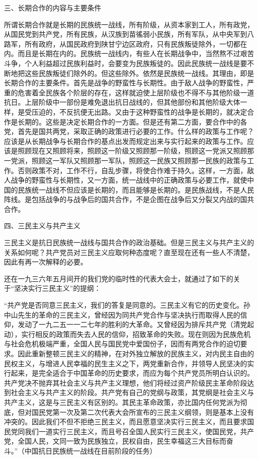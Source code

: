 三、长期合作的内容与主要条件

所谓长期合作就是长期的民族统一战线，所有阶级，从资本家到工人，所有政党，从国民党到共产党，所有民族，从汉族到苗徭弱小民族，所有军队，从中央军到八路军，所有政府，从国民政府到陕甘宁边区政府，只有民族叛徒除外，一切都在内。而且是长期在内的。民族统一战线内，有些人在长期战争中，当然熬不过艰苦斗争，个人利益超过民族利益时，会要变为民族叛徒的。因此民族统一战线是要不断地把这些民族叛徒们除外的。但这些除外。依然是民族统一战线。其理由，即是长期合作的主要条件。首先是战争的野蛮性与长期性。由于敌人战争的野蛮性，严重的危害着全民族各个阶层的存在，这样就迫使上层阶级也不得不与其他阶级一道抗日。上层阶级中一部份是难免退出抗日战线的，但其他部份和其他阶级大体一样，是受压迫的，不反抗便无出路。又由于这种野蛮性的战争是长期的，就决定合作是长期的。这些是决定长期合作的一方面。但是还有第二方面，要合作中的各党，首先是国共两党，采取正确的政策进行必要的工作。什么样的政策与工作呢？应该是从长期战争与长期合作的基点出发而规定出来与实行起来的政策与工作。应该是照顾现在又照顾将来，照顾这一阶级又照顾那一阶级，照顾这一党派又照顾那一党派，照顾这一军队又照顾那一军队，照顾这一民族又照顾那一民族的政策与工作。否则政策不对，工作不行，自乱步骤，将使合作难于持久。这样，一方面，敌人战争的野蛮性与长期性，又一方面，统一战线中的正确政策与必要工作，就使中国的民族统一战线不但应该是长期的，而且能够是长期的。是民族战线，不是人民阵线。是包括战争的与战争后的国共合作，不是企图在战争后又分裂又内战的国共合作。

四、三民主义与共产主义

三民主义是抗日民族统一战线与国共合作的政治基础。但是三民主义与共产主义的关系如何呢？共产党员对三民主义应取何种态度呢？直至现在还有一些人不清楚，因此有再一次解释的必要。

还在一九三六年五月间开的我们党的临时性的代表大会士，就通过了如下的关于“坚决实行三民主义”的提纲：

“共产党是否同意三民主义，我们的答复是同意的。三民主义有它的历史变化。孙中山先生的革命的三民主义，曾经因为同共产党合作与坚决执行而取得人民的信仰，发动了一九二五一一二七年的胜利的大革命。又曾经因为排斥共产党（清党起动），实行相反的政策而失去人民的信仰，招致革命的失败。现在则因为民族危机与社会危机极端严重，全国人民与国民党中爱国份子，因而有两党合作的迫切要求。因此重新整顿三民主义的精神，在对外独立解放的民族主义，对内民主自由的民权主义，与增进人民幸福的民生主义之下，两党重新合作，并领导人民坚决的实行起来，是完全适合于中国革命的历史要求，而应为每个共产党员所明白认识的。共产党决不抛弃其社会主义与共产主义理想，他们将经过资产阶级民主革命阶段达到社会主义与共产主义的阶段。共产党有自己的党纲与政策，其党纲是社会主义与共产主义，这是与三民主义有区别的。其民主革命政策，亦比国内任何党派为彻底，但对国民党第一次及第二次代表大会所宣布的三民主义纲领，则是基本上没有冲突的。因此我们不但不拒绝三民主义，而且愿意坚决实行三民主义，而且要求国民党同我们一道实行三民主义，而且号召全国人民实行三民主义，使国民党，共产党，全国人民，文同一致为民族独立，民权自由，民生幸福这三大目标而奋斗。”（中国抗日民族统一战线在目前阶段的任务）

